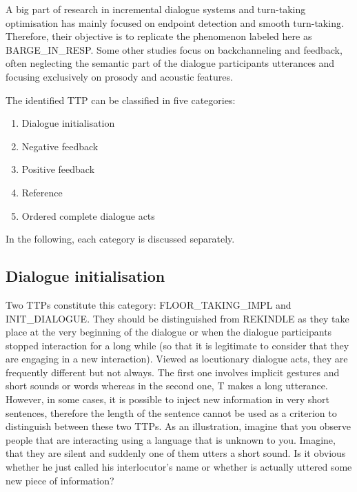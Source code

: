     A big part of research in incremental dialogue systems and turn-taking optimisation has mainly focused on endpoint detection \cite{Raux2008} and smooth turn-taking. Therefore, their objective is to replicate the phenomenon labeled here as BARGE\_IN\_RESP. Some other studies focus on backchanneling and feedback, often neglecting the semantic part of the dialogue participants utterances and focusing exclusively on prosody and acoustic features.
    


    The identified TTP can be classified in five categories:
    
    \begin{enumerate}
      \item Dialogue initialisation
      \item Negative feedback
      \item Positive feedback
      \item Reference
      \item Ordered complete dialogue acts
    \end{enumerate}

    In the following, each category is discussed separately.

    \subsection{Dialogue initialisation}
		
			Two TTPs constitute this category: FLOOR\_TAKING\_IMPL and INIT\_DIALOGUE. They should be distinguished from REKINDLE as they take place at the very beginning of the dialogue or when the dialogue participants stopped interaction for a long while (so that it is legitimate to consider that they are engaging in a new interaction). Viewed as locutionary dialogue acts, they are frequently different but not always. The first one involves implicit gestures and short sounds or words whereas in the second one, T makes a long utterance. However, in some cases, it is possible to inject new information in very short sentences, therefore the length of the sentence cannot be used as a criterion to distinguish between these two TTPs. As an illustration, imagine that you observe people that are interacting using a language that is unknown to you. Imagine, that they are silent and suddenly one of them utters a short sound. Is it obvious whether he just called his interlocutor's name or whether is actually uttered some new piece of information?
			
